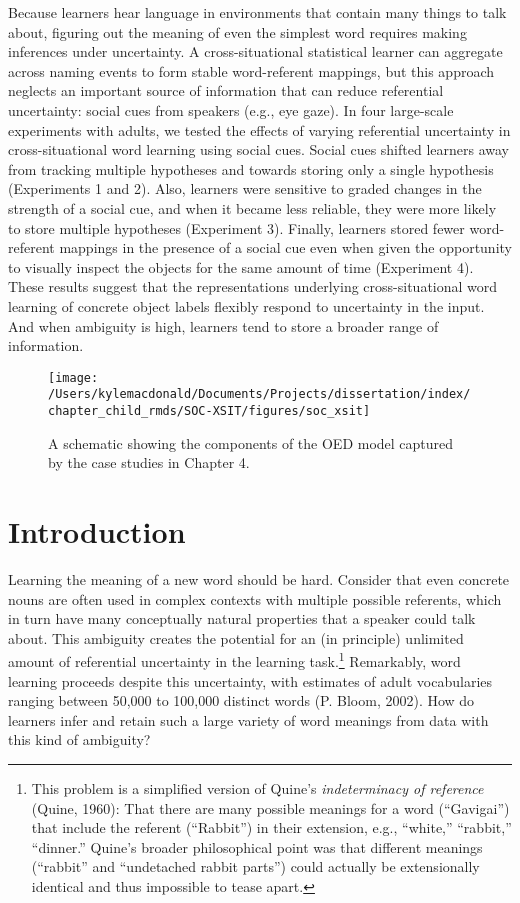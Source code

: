 \documentclass[oneside]{report}
\begin{document}
Because learners hear language in environments that contain many things
to talk about, figuring out the meaning of even the simplest word
requires making inferences under uncertainty. A cross-situational
statistical learner can aggregate across naming events to form stable
word-referent mappings, but this approach neglects an important source
of information that can reduce referential uncertainty: social cues from
speakers (e.g., eye gaze). In four large-scale experiments with adults,
we tested the effects of varying referential uncertainty in
cross-situational word learning using social cues. Social cues shifted
learners away from tracking multiple hypotheses and towards storing only
a single hypothesis (Experiments 1 and 2). Also, learners were sensitive
to graded changes in the strength of a social cue, and when it became
less reliable, they were more likely to store multiple hypotheses
(Experiment 3). Finally, learners stored fewer word-referent mappings in
the presence of a social cue even when given the opportunity to visually
inspect the objects for the same amount of time (Experiment 4). These
results suggest that the representations underlying cross-situational
word learning of concrete object labels flexibly respond to uncertainty
in the input. And when ambiguity is high, learners tend to store a
broader range of information.
\begin{figure}[!t]

{\centering \texttt{[image: /Users/kylemacdonald/Documents/Projects/dissertation/index/chapter\_child\_rmds/SOC-XSIT/figures/soc\_xsit]} 

}

\caption[Overview of Chapter 4.]{A schematic showing the components of the OED model captured by the case studies in Chapter 4.}\label{fig:schematic-soc-xsit}
\end{figure}
\section{Introduction}\label{introduction-3}

Learning the meaning of a new word should be hard. Consider that even
concrete nouns are often used in complex contexts with multiple possible
referents, which in turn have many conceptually natural properties that
a speaker could talk about. This ambiguity creates the potential for an
(in principle) unlimited amount of referential uncertainty in the
learning task.\footnote{This problem is a simplified version of Quine's
  \textit{indeterminacy of reference} (Quine, 1960): That there are many
  possible meanings for a word (``Gavigai'') that include the referent
  (``Rabbit'') in their extension, e.g., ``white,'' ``rabbit,''
  ``dinner.'' Quine's broader philosophical point was that different
  meanings (``rabbit'' and ``undetached rabbit parts'') could actually
  be extensionally identical and thus impossible to tease apart.}
Remarkably, word learning proceeds despite this uncertainty, with
estimates of adult vocabularies ranging between 50,000 to 100,000
distinct words (P. Bloom, 2002). How do learners infer and retain such a
large variety of word meanings from data with this kind of ambiguity?
\end{document}
